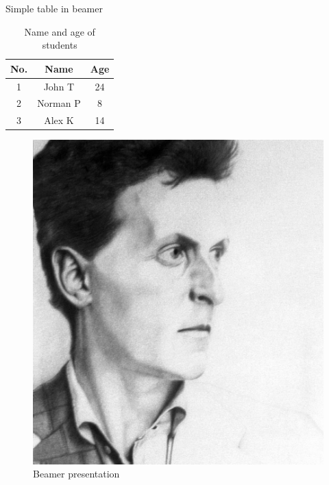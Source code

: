 \documentclass{beamer}
\begin{document}
\begin{frame}{Simple table in beamer}
\begin{table}
\begin{tabular}{| c || c | c |}
    \hline
    No. & Name & Age \\
    \hline \hline
    1 & John T & 24 \\
    2 & Norman P & 8 \\
    3 & Alex K & 14 \\ 
    \hline
\end{tabular}
\caption{Name and age of students}
\end{table}
\end{frame}

\begin{frame}
\begin{figure}
    \includegraphics[scale=0.5]{wittgenstein}
    \caption{Beamer presentation}
\end{figure}
\end{frame}
\end{document}
